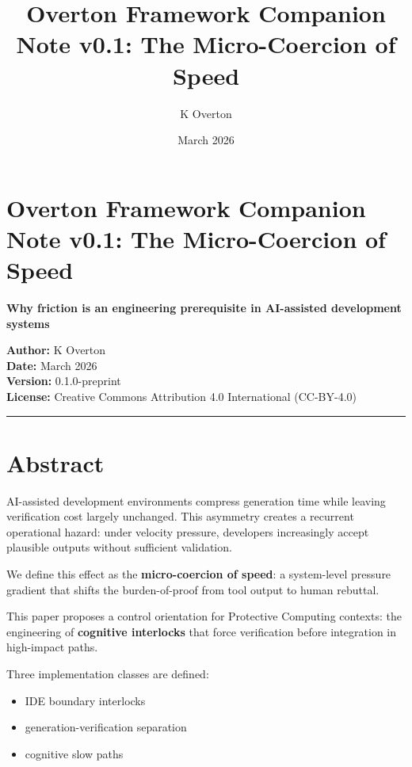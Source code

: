 \documentclass[
]{article}
\title{Overton Framework Companion Note v0.1: The Micro-Coercion of
Speed}
\author{K Overton}
\date{March 2026}
\providecommand{\tightlist}{%
  \setlength{\itemsep}{0pt}\setlength{\parskip}{0pt}}
\begin{document}
\maketitle

\section{Overton Framework Companion Note v0.1: The Micro-Coercion of
Speed}\label{overton-framework-companion-note-v01-the-micro-coercion-of-speed}

\textbf{Why friction is an engineering prerequisite in AI-assisted
development systems}

\textbf{Author:} K Overton\\
\textbf{Date:} March 2026\\
\textbf{Version:} 0.1.0-preprint\\
\textbf{License:} Creative Commons Attribution 4.0 International
(CC-BY-4.0)

\begin{center}\rule{0.5\linewidth}{0.5pt}\end{center}

\section{Abstract}\label{abstract}

AI-assisted development environments compress generation time while
leaving verification cost largely unchanged. This asymmetry creates a
recurrent operational hazard: under velocity pressure, developers
increasingly accept plausible outputs without sufficient validation.

We define this effect as the \textbf{micro-coercion of speed}: a
system-level pressure gradient that shifts the burden-of-proof from tool
output to human rebuttal.

This paper proposes a control orientation for Protective Computing
contexts: the engineering of \textbf{cognitive interlocks} that force
verification before integration in high-impact paths.

Three implementation classes are defined:

\begin{itemize}
\tightlist
\item
  IDE boundary interlocks
\item
  generation-verification separation
\item
  cognitive slow paths
\end{itemize}
\end{document}
